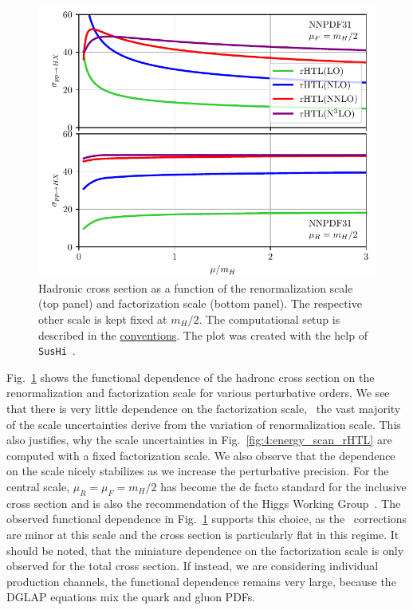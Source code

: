 \begin{figure}[h]
\centering
\includegraphics[width=\figurewidth]{Images/scale_scan.pdf}
\caption{Hadronic cross section as a function of the renormalization scale (top panel) and factorization scale (bottom panel). The respective other scale is kept fixed at $m_H/2$. The computational setup is described in the \hyperref[chap:notation_and_conventions]{conventions}. The plot was created with the help of \texttt{SusHi}~\cite{Harlander:2012pb, Harlander:2016hcx}.}
\label{fig:4:scale_scan}
\end{figure}
Fig.~\ref{fig:4:scale_scan} shows the functional dependence of the hadronc cross section on the renormalization and factorization scale for various perturbative orders. We see that there is very little dependence on the factorization scale, \ie\ the vast majority of the scale uncertainties derive from the variation of renormalization scale. This also justifies, why the scale uncertainties in Fig.~\ref{fig:4:energy_scan_rHTL} are computed with a fixed factorization scale. We also observe that the dependence on the scale nicely stabilizes as we increase the perturbative precision. For the central scale, $\mu_R = \mu_F = m_H/2$ has become the de facto standard for the inclusive cross section and is also the recommendation of the Higgs Working Group~\cite{LHCHiggsCrossSectionWorkingGroup:2016ypw}. The observed functional dependence in Fig.~\ref{fig:4:scale_scan} supports this choice, as the \NNNLO\ corrections are minor at this scale and the cross section is particularly flat in this regime. It should be noted, that the miniature dependence on the factorization scale is only observed for the total cross section. If instead, we are considering individual production channels, the functional dependence remains very large, because the DGLAP equations mix the quark and gluon \acs{PDF}s.

